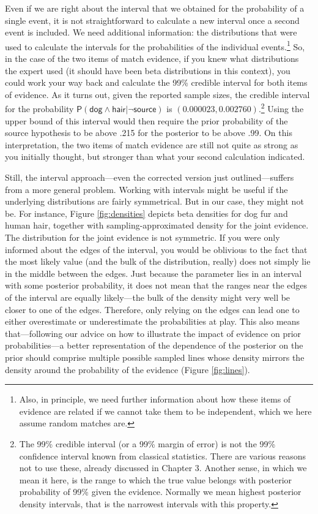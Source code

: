 \documentclass[
  10pt,
  dvipsnames,enabledeprecatedfontcommands]{scrartcl}
\newcommand{\s}[1]{\mbox{$\mathsf{#1}$}}
\begin{document}
Even if we are right about the interval that we obtained for the
probability of a single event, it is not straightforward to calculate a
new interval once a second event is included. We need additional
information: the distributions that were used to calculate the intervals
for the probabilities of the individual events.\footnote{Also, in
  principle, we need further information about how these items of
  evidence are related if we cannot take them to be independent, which
  we here assume random matches are.} So, in the case of the two items
of match evidence, if you knew what distributions the expert used (it
should have been beta distributions in this context), you could work
your way back and calculate the 99\% credible interval for both items of
evidence. As it turns out, given the reported sample sizes, the credible
interval for the probability
\(\mathsf{P}(\s{dog}\wedge \s{hair} \vert \neg \s{source})\) is
\((0.000023, 0.002760)\).\footnote{The 99\% credible interval (or a 99\%
  margin of error) is not the 99\% confidence interval known from
  classical statistics. There are various reasons not to use these,
  already discussed in Chapter 3. Another sense, in which we mean it
  here, is the range to which the true value belongs with posterior
  probability of 99\% given the evidence. Normally we mean highest
  posterior density intervals, that is the narrowest intervals with this
  property.} Using the upper bound of this interval would then require
the prior probability of the source hypothesis to be above .215 for the
posterior to be above .99. On this interpretation, the two items of
match evidence are still not quite as strong as you initially thought,
but stronger than what your second calculation indicated.

Still, the interval approach---even the corrected version just
outlined---suffers from a more general problem. Working with intervals
might be useful if the underlying distributions are fairly symmetrical.
But in our case, they might not be. For instance, Figure
\ref{fig:densities} depicts beta densities for dog fur and human hair,
together with sampling-approximated density for the joint evidence. The
distribution for the joint evidence is not symmetric. If you were only
informed about the edges of the interval, you would be oblivious to the
fact that the most likely value (and the bulk of the distribution,
really) does not simply lie in the middle between the edges. Just
because the parameter lies in an interval with some posterior
probability, it does not mean that the ranges near the edges of the
interval are equally likely---the bulk of the density might very well be
closer to one of the edges. Therefore, only relying on the edges can
lead one to either overestimate or underestimate the probabilities at
play. This also means that---following our advice on how to illustrate
the impact of evidence on prior probabilities---a better representation
of the dependence of the posterior on the prior should comprise multiple
possible sampled lines whose density mirrors the density around the
probability of the evidence (Figure \ref{fig:lines}).
\end{document}
